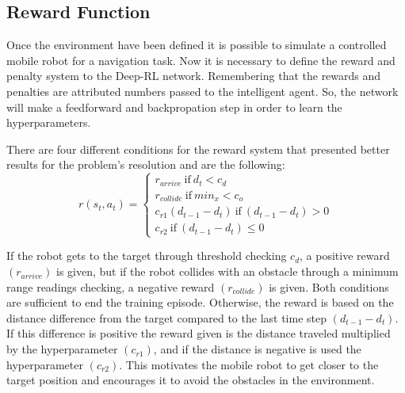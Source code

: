 \subsection*{Reward Function}

Once the environment have been defined it is possible to simulate a controlled mobile robot for a navigation task.
Now it is necessary to define the reward and penalty system to the Deep-RL network.
Remembering that the rewards and penalties are attributed numbers passed to the intelligent agent.
So, the network will make a feedforward and backpropation step in order to learn the hyperparameters.

There are four different conditions for the reward system that presented better results for the problem's resolution and are the following:
\begin{equation}
r (s_t, a_t) = 
\begin{cases}
r_{arrive} \ \textrm{if} \ d_t < c_d
\\
r_{collide} \ \textrm{if}\ min_x < c_o
\\
c_{r1}(d_{t-1} - d_t) \ \textrm{if} \ (d_{t-1} - d_t) > 0
\\
c_{r2} \ \textrm{if} \ (d_{t-1} - d_t) \leq 0
\end{cases}
\end{equation}

If the robot gets to the target through threshold checking $c_d$, a positive reward $(r_{arrive})$ is given, but if the robot collides with an obstacle through a minimum range readings checking, a negative reward $(r_{collide})$ is given.
Both conditions are sufficient to end the training episode.
Otherwise, the reward is based on the distance difference from the target compared to the last time step $(d_{t-1} - d_t)$. 
If this difference is positive the reward given is the distance traveled multiplied by the hyperparameter $(c_{r1})$, and if the distance is negative is used the hyperparameter $(c_{r2})$.
This motivates the mobile robot to get closer to the target position and encourages it to avoid the obstacles in the environment.


